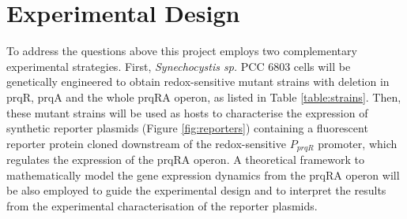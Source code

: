 \section{Experimental Design}
To address the questions above this project employs two complementary experimental strategies. First, \textit{Synechocystis sp.} PCC 6803 cells will be genetically engineered to obtain redox-sensitive mutant strains with deletion in prqR, prqA and the whole prqRA operon, as listed in Table \ref{table:strains}. Then, these mutant strains will be used as hosts to characterise the expression of synthetic reporter plasmids (Figure \ref{fig:reporters}) containing a fluorescent reporter protein cloned downstream of the redox-sensitive $P_{prqR}$ promoter, which regulates the expression of the prqRA operon. A theoretical framework to mathematically model the gene expression dynamics from the prqRA operon will be also employed to guide the experimental design and to interpret the results from the experimental characterisation of the reporter plasmids.


